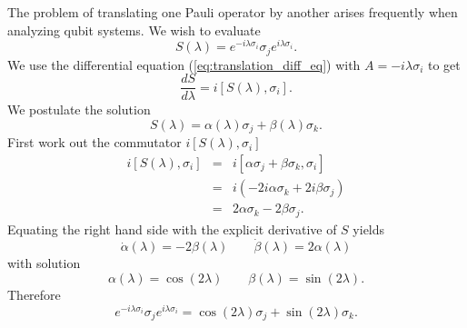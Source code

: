 The problem of translating one Pauli operator by another arises frequently when analyzing qubit systems.
We wish to evaluate \begin{equation}
S(\lambda) = e^{-i\lambda\sigma_i}\sigma_j e^{i\lambda\sigma_i}. \end{equation}
We use the differential equation (\ref{eq:translation_diff_eq}) with $A=-i\lambda\sigma_i$ to get \begin{equation}
\frac{dS}{d\lambda} = i[S(\lambda),\sigma_i]. \end{equation}
We postulate the solution \begin{equation}
S(\lambda) = \alpha(\lambda)\sigma_j + \beta(\lambda)\sigma_k. \end{equation}
First work out the commutator $i[S(\lambda),\sigma_i]$ \begin{eqnarray*}
i[S(\lambda),\sigma_i] &=& i[\alpha\sigma_j + \beta\sigma_k, \sigma_i] \\
&=& i \left( -2i\alpha \sigma_k + 2i\beta \sigma_j \right) \\
&=& 2\alpha \sigma_k - 2\beta \sigma_j. \end{eqnarray*}
Equating the right hand side with the explicit derivative of $S$ yields \begin{equation}
\dot{\alpha}(\lambda) = -2\beta(\lambda) \qquad \dot{\beta}(\lambda) = 2\alpha(\lambda) \nonumber \end{equation}
with solution \begin{equation}
\alpha(\lambda) = \cos \left( 2\lambda \right) \qquad \beta(\lambda) = \sin \left( 2\lambda \right). \nonumber \end{equation}
Therefore \begin{equation}
e^{-i\lambda\sigma_i}\sigma_j e^{i\lambda\sigma_i} = \cos \left( 2\lambda \right) \sigma_j + \sin \left( 2\lambda \right) \sigma_k. \end{equation}
